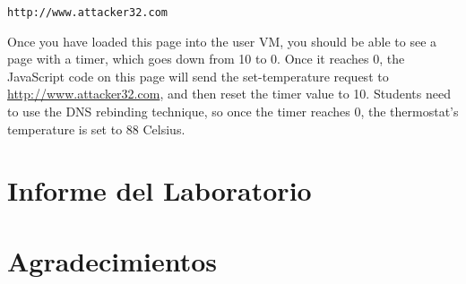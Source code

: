 \begin{lstlisting}
http://www.attacker32.com
\end{lstlisting}
 

Once you have loaded this page into the user VM, you should be able to see a page with a 
timer, which goes down from 10 to 0. Once it reaches 0, the JavaScript code 
on this page will send the set-temperature request to 
\url{http://www.attacker32.com}, and then reset the timer value to 10. 
Students need to use the DNS rebinding technique, so
once the timer reaches 0, the thermostat's temperature is set to 
88 Celsius. 



\section{Informe del Laboratorio}



\section*{Agradecimientos}






